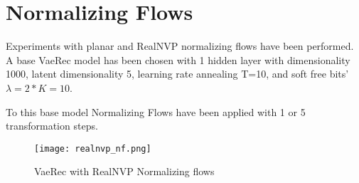 \section{Normalizing Flows}

Experiments with planar and RealNVP normalizing flows have been performed.
A base VaeRec model has been chosen with 1 hidden layer with dimensionality 1000, latent dimensionality 5, learning rate annealing T=10, and soft free bits' $\lambda=2*K=10$.

To this base model Normalizing Flows have been applied with 1 or 5 transformation steps.

\begin{figure}[H]
\centering
\texttt{[image: realnvp\_nf.png]}
\caption{VaeRec with RealNVP Normalizing flows}
\label{realnvp_nf_fig}
\end{figure}

